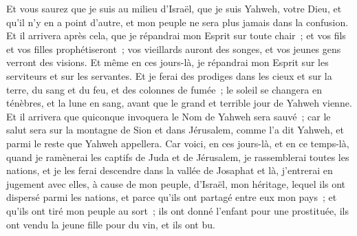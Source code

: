 \begin{multicols}{2}
Et vous saurez que je suis au milieu d'Israël, que je suis Yahweh, votre Dieu, et qu'il n'y en a point d'autre, et mon peuple ne sera plus jamais dans la confusion.
Et il arrivera après cela, que je répandrai mon Esprit sur toute chair~; et vos fils et vos filles prophétiseront~; vos vieillards auront des songes, et vos jeunes gens verront des visions.
Et même en ces jours-là, je répandrai mon Esprit sur les serviteurs et sur les servantes.
Et je ferai des prodiges dans les cieux et sur la terre, du sang et du feu, et des colonnes de fumée~;
le soleil se changera en ténèbres, et la lune en sang, avant que le grand et terrible jour de Yahweh vienne.
Et il arrivera que quiconque invoquera le Nom de Yahweh sera sauvé~; car le salut sera sur la montagne de Sion et dans Jérusalem, comme l'a dit Yahweh, et parmi le reste que Yahweh appellera.
\VerseOne{}Car voici, en ces jours-là, et en ce temps-là, quand je ramènerai les captifs de Juda et de Jérusalem,
je rassemblerai toutes les nations, et je les ferai descendre dans la vallée de Josaphat et là, j'entrerai en jugement avec elles, à cause de mon peuple, d'Israël, mon héritage, lequel ils ont dispersé parmi les nations, et parce qu'ils ont partagé entre eux mon pays~;
et qu'ils ont tiré mon peuple au sort~; ils ont donné l'enfant pour une prostituée, ils ont vendu la jeune fille pour du vin, et ils ont bu.

\end{multicols}
